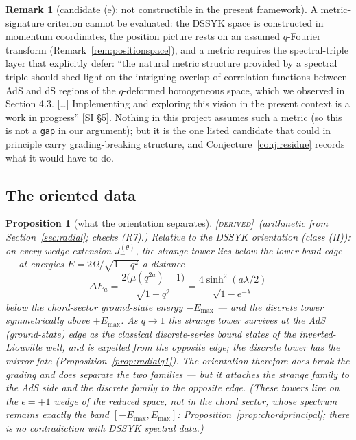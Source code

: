 \documentclass[11pt,a4paper]{article}
\newcommand{\DERIVED}{{\color{teal}\textsc{[derived]}}}
\theoremstyle{definition}
\newtheorem{remark}[definition]{Remark}
\theoremstyle{plain}
\newtheorem{proposition}[definition]{Proposition}
\newcommand{\tCas}{\tilde\Omega}                %
\begin{document}
\begin{remark}[candidate (e): not constructible in the present framework]
\label{rem:metriccriterion}
A metric-signature criterion cannot be evaluated: the DSSYK space is constructed in momentum
coordinates, the position picture rests on an assumed $q$-Fourier transform
(Remark~\ref{rem:positionspace}), and a metric requires the spectral-triple layer that
\cite{Schouten:2025dssyk} explicitly defer: ``the natural metric structure provided by a
spectral triple should shed light on the intriguing overlap of correlation functions between
AdS and dS regions of the $q$-deformed homogeneous space, which we observed in Section 4.3.
[\ldots] Implementing and exploring this vision in the present context is a work in
progress'' [SI \S5]. Nothing in this project assumes such a metric (so this is not a
\texttt{gap} in our argument); but it is the one listed candidate that could in principle
carry grading-breaking structure, and Conjecture~\ref{conj:residue} records what it would
have to do.
\end{remark}

\subsection{The oriented data}

\begin{proposition}[what the orientation separates]\label{prop:orientation}
\DERIVED\ (arithmetic from Section~\ref{sec:radial}; checks (R7).) Relative to the DSSYK
orientation (class (II)): on every wedge extension $J^{(\theta)}_{-}$, the strange tower
lies \emph{below the lower band edge} --- at energies $E=2\tCas/\sqrt{1-q^{2}}$ a distance
\begin{equation}\label{eq:bindingenergy}
  \Delta E_{a}=\frac{2\bigl(\mu(q^{2a})-1\bigr)}{\sqrt{1-q^{2}}}
  =\frac{4\sinh^{2}(a\lambda/2)}{\sqrt{1-e^{-\lambda}}}
\end{equation}
below the chord-sector ground-state energy $-E_{\max}$ --- and the discrete tower
symmetrically above $+E_{\max}$. As $q\to1$ the strange tower survives at the AdS
(ground-state) edge as the classical discrete-series bound states of the inverted-Liouville
well, and is expelled from the opposite edge; the discrete tower has the mirror fate
(Proposition~\ref{prop:radialq1}). The orientation therefore \emph{does} break the grading
and \emph{does} separate the two families --- but it attaches the \emph{strange} family to
the AdS side and the \emph{discrete} family to the opposite edge. (These towers live on the
$\epsilon=+1$ wedge of the reduced space, not in the chord sector, whose spectrum remains
exactly the band $[-E_{\max},E_{\max}]$: Proposition~\ref{prop:chordprincipal}; there is no
contradiction with DSSYK spectral data.)
\end{proposition}
\end{document}
